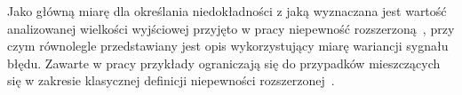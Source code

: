 Jako główną miarę dla określania niedokładności z jaką wyznaczana jest wartość analizowanej wielkości wyjściowej przyjęto w pracy niepewność rozszerzoną~\cite{jcgm_guide}, przy czym równolegle przedstawiany jest opis wykorzystujący miarę wariancji sygnału błędu. Zawarte w pracy przykłady ograniczają się do przypadków mieszczących się w zakresie klasycznej definicji niepewności rozszerzonej~\cite{jcgm_guide}.
